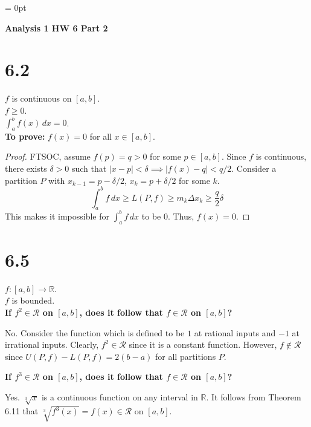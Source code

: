 \documentclass[12pt]{article}
\begin{document}


\setcounter{section}{0}
\renewcommand{\thesection}{}


\parindent = 0pt


      {\bf Analysis 1 HW 6 Part 2}

\section{6.2}
$f$ is continuous on $[a, b]$.\\
$f\geq 0$.\\
$\int_{a}^{b} f(x) \, dx=0$.\\

{\bf To prove:} $f(x)=0$ for all $x\in[a, b]$.

\begin{proof}
    FTSOC, assume $f(p)=q>0$ for some $p\in[a, b]$. Since $f$ is continuous, there exists $\delta>0$ such that $|x-p|<\delta \implies |f(x)-q|< q/2$. Consider a partition $P$ with $x_{k-1}=p-\delta/2$, $x_{k}=p+\delta/2$ for some $k$. 
    $$
    \int_{a}^{b} f \, dx \geq L(P, f)\geq m_{k}\Delta x_{k}\geq \frac{q}{2}\delta
    $$
    This makes it impossible for $\int_{a}^{b} f \, dx$ to be $0$. Thus, $f(x)=0$.
\end{proof}
\pagebreak


\section{6.5}

$f:[a, b]\to \mathbb{R}$.\\
$f$ is bounded.\\

{\bf If $f^{2}\in\mathscr R$ on $[a, b]$, does it follow that $f\in \mathscr R$ on $[a, b]$?}

No. Consider the function which is defined to be $1$ at rational inputs and $-1$ at irrational inputs. Clearly, $f^{2}\in\mathscr R$ since it is a constant function. However, $f\not\in \mathscr R$ since $U(P, f)-L(P, f)=2(b-a)$ for all partitions $P$. 

{\bf If $f^{3}\in\mathscr R$ on $[a, b]$, does it follow that $f\in \mathscr R$ on $[a, b]$?}

Yes. $\sqrt[3]{ x }$ is a continuous function on any interval in $\mathbb{R}$. It follows from Theorem 6.11 that $\sqrt[3]{ f^{3}(x) }=f(x)\in \mathscr R$ on $[a, b]$. 
\pagebreak
\end{document}
